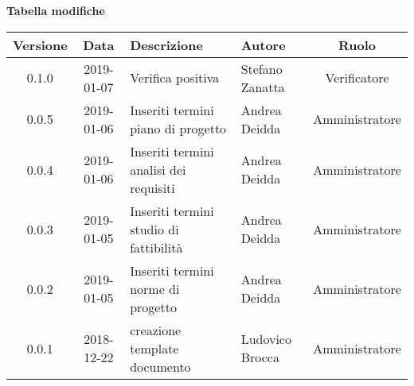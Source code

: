 \begin{center}
	\textbf{Tabella modifiche}
	\end{center}
	\begin{center}
		\begin{tabularx}{\textwidth}{|c|c|X|X|c|}
			\hline
			\textbf{Versione} & \textbf{Data} & \textbf{Descrizione} & \textbf{Autore} & \textbf{Ruolo} \\
			\hline
			0.1.0 & 2019-01-07 & Verifica positiva & Stefano Zanatta & Verificatore \\
			\hline
			0.0.5 & 2019-01-06 & Inseriti termini piano di progetto & Andrea Deidda & Amministratore\\
			\hline
			0.0.4 & 2019-01-06 & Inseriti termini analisi dei requisiti & Andrea Deidda & Amministratore\\
			\hline
			0.0.3 & 2019-01-05 & Inseriti termini studio di fattibilità & Andrea Deidda & Amministratore\\
			\hline
			0.0.2 & 2019-01-05 & Inseriti termini norme di progetto & Andrea Deidda & Amministratore\\
			\hline
			0.0.1 & 2018-12-22 & creazione template documento & Ludovico Brocca & Amministratore\\
			\hline
		\end{tabularx}
	\end{center}
\newpage